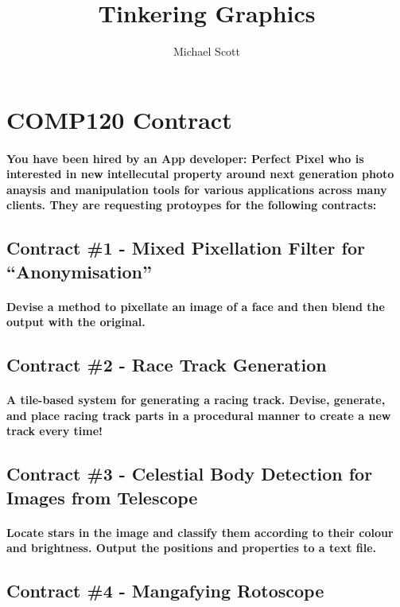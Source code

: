 \documentclass{../../fal_assignment}
\title{Tinkering Graphics}
\author{Michael Scott}
\begin{document}
\section*{COMP120 Contract}

\paragraph{You have been hired by an App developer: Perfect Pixel who is interested in new intellecutal property around next generation photo anaysis and manipulation tools for various applications across many clients. They are requesting protoypes for the following contracts:}

\subsection*{Contract \#1 - Mixed Pixellation Filter for ``Anonymisation''}

\paragraph{Devise a method to pixellate an image of a face and then blend the output with the original.} 

\subsection*{Contract \#2 - Race Track Generation}

\paragraph{A tile-based system for generating a racing track. Devise, generate, and place racing track parts in a procedural manner to create a new track every time!}

\subsection*{Contract \#3 - Celestial Body Detection for Images from Telescope}

\paragraph{Locate stars in the image and classify them according to their colour and brightness. Output the positions and properties to a text file.}

\subsection*{Contract \#4 - Mangafying Rotoscope }
\end{document}
